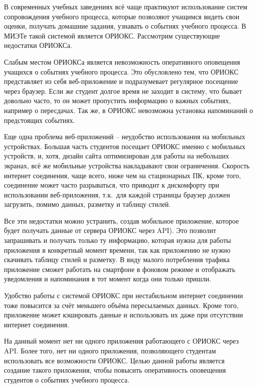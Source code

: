 \Introduction
{}
В современных учебных заведениях всё чаще практикуют использование систем сопровождения учебного процесса, которые позволяют учащимся видеть свои оценки, получать домашние задания, узнавать о событиях учебного процесса.
В МИЭТе такой системой является ОРИОКС\@.
Рассмотрим существующие недостатки ОРИОКСа.

Слабым местом ОРИОКСа является невозможность оперативного оповещения учащихся о событиях учебного процесса.
Это обусловлено тем, что ОРИОКС представляет из себя веб-приложение
и подразумевает регулярное посещение через браузер.
Если же студент долгое время не заходит в систему, что бывает довольно часто, то он может пропустить информацию о важных событиях, например о пересдачах.
Так же, в ОРИОКС невозможна установка напоминаний о предстоящих событиях.

Еще одна проблема веб-приложений – неудобство использования на мобильных
устройствах.
Большая часть студентов посещает ОРИОКС именно с мобильных
устройств, и, хотя, дизайн сайта оптимизирован для работы на небольших экранах, всё же мобильные устройства накладывают свои ограничения.
Скорость интернет соединения, чаще всего, ниже чем на стационарных ПК,
кроме того, соединение может часто разрываться, что приводит к дискомфорту
при использовании веб-приложения, т.к.\ для каждой страницы браузер должен
загрузить, помимо данных, разметку и таблицу стилей.

Все эти недостатки можно устранить, создав мобильное приложение,
которое
будет получать данные от сервера ОРИОКС через API).
Это позволит запрашивать и получать только ту информацию, которая нужна для работы приложения в конкретный момент времени, так как приложению не нужно скачивать таблицу стилей и разметку.
В виду малого потребления трафика приложение сможет работать на смартфоне в фоновом режиме и отображать уведомления и напоминания в тот момент когда они только пришли.

Удобство работы с системой ОРИОКС при нестабильном интернет соединении тоже повысится за счёт меньшего объёма пересылаемых данных.
Кроме того, приложение может кэшировать данные и использовать их даже при отсутствии интернет соединения.

На данный момент нет ни одного приложения работающего с ОРИОКС через API\@.
Более того, нет ни одного приложения, позволяющего студентам использовать все возможности ОРИОКС\@.
Целью данной работы является создание такого приложения, чтобы повысить оперативность оповещения студентов о событиях учебного процесса.
